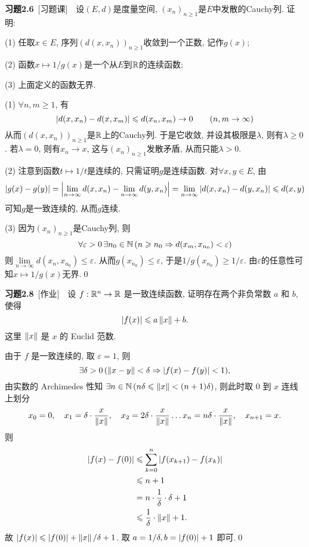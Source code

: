 	\textbf{习题2.6}\ [习题课]\ \ 设$ (E,d) $是度量空间, $ (x_n)_{n\geqslant 1} $是$ E $中发散的Cauchy列. 证明:
	
	(1) 任取$ x\in E $, 序列$ (d(x,x_n))_{n\geqslant 1} $收敛到一个正数, 记作$ g(x) $;
	
	(2) 函数$ x\mapsto1/g(x) $是一个从$ E $到$ \mathbb{R} $的连续函数;
	
	(3) 上面定义的函数无界.
	\begin{Proof}
	(1) $ \forall n,m\geqslant 1 $, 有
	\[
	\left| d(x,x_n)-d(x,x_m) \right| \leqslant d(x_n,x_m)\to 0\qquad (n,m\to\infty)
	\]
	从而$ (d(x,x_n))_{n\geqslant 1} $是$ \mathbb{R} $上的Cauchy列. 于是它收敛, 并设其极限是$ \lambda $, 则有$ \lambda\geqslant 0 $. 若$ \lambda=0 $, 则有$ x_n\to x $, 这与$ (x_n)_{n\geqslant 1} $发散矛盾, 从而只能$ \lambda>0 $.
	
	(2) 注意到函数$ t\mapsto 1/t $是连续的, 只需证明$ g $是连续函数. 对$ \forall x,y\in E $, 由
	\[
	\left| g(x)-g(y) \right| =\left| \lim\limits_{n\to\infty}d(x,x_n)-\lim\limits_{n\to\infty}d(y,x_n) \right| =\lim\limits_{n\to\infty}\left| d(x,x_n)-d(y,x_n) \right| \leqslant d(x,y)
	\]
	可知$ g $是一致连续的, 从而$ g $连续.
	
	(3) 因为$ (x_n)_{n\geqslant 1} $是Cauchy列, 则
	\[
	\forall\varepsilon>0\,\exists n_0\in\mathbb{N}\,(n\geqslant n_0\Rightarrow d(x_m,x_{n_0})<\varepsilon)
	\]
	则$ \lim\limits_{n\to\infty}d(x_n,x_{n_0})\leqslant\varepsilon $. 从而$ g(x_{n_0})\leqslant\varepsilon $, 于是$ 1/g(x_{n_0})\geqslant 1/\varepsilon $. 由$ \varepsilon $的任意性可知$ x\mapsto 1/g(x) $无界.\qed
	\end{Proof}
	
	\textbf{习题2.8}\ [作业]\ \ 设 $ f: \mathbb{R}^{n}\to\mathbb{R} $ 是一致连续函数, 证明存在两个非负常数 $ a $ 和 $ b $, 使得
	\[
		\left| f(x) \right| \leqslant a\left\| x \right\|+b.
	\]
	这里 $ \left\| x \right\| $ 是 $ x $ 的 Euclid 范数.

	\begin{Proof}
		由于 $ f $ 是一致连续的, 取 $ \varepsilon=1 $, 则
		\[
			\exists \delta>0\,(\left\| x-y \right\|<\delta\Rightarrow\left| f(x)-f(y) \right| <1),
		\]
		由实数的 Archimedes 性知 $ \exists n\in\mathbb{N}\,(n\delta\leqslant\left\| x \right\|<(n+1)\delta) $, 则此时取 $ 0 $ 到 $ x $ 连线上划分
		\[
			x_{0}=0,\quad x_{1}=\delta\cdot\frac{x}{\left\| x \right\|},\quad x_{2}=2\delta\cdot\frac{x}{\left\| x \right\|}\dots x_{n}=n\delta\cdot\frac{x}{\left\| x \right\|},\quad x_{n+1}=x.
		\]
		则 
		\[
			\begin{aligned}
				\left| f(x)-f(0) \right|  & \leqslant\sum_{k=0}^{n}\left| f(x_{k+1})-f(x_{k}) \right| \\
				& \leqslant n+1\\
				& = n\cdot\frac{1}{\delta}\cdot\delta+1\\
				& \leqslant\frac{1}{\delta}\cdot\left\| x \right\|+1.
			\end{aligned}
		\]
		故 $ \left| f(x) \right| \leqslant\left| f(0) \right| +\left\| x \right\|/\delta+1 $. 取 $ a=1/\delta, b=\left| f(0) \right| +1 $ 即可.\qed
	\end{Proof}
	
